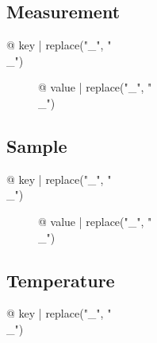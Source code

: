 \subsection{Measurement}

\begin{description}
\item[{@ key | replace("_", "\\_") }] {@ value | replace("_", "\\_") }
\end{description}

\subsection{Sample}

\begin{description}
\item[{@ key | replace("_", "\\_") }] {@ value | replace("_", "\\_") }
\end{description}

\subsection{Temperature}

\begin{description}
\item[{@ key | replace("_", "\\_") }] %

\end{description}
